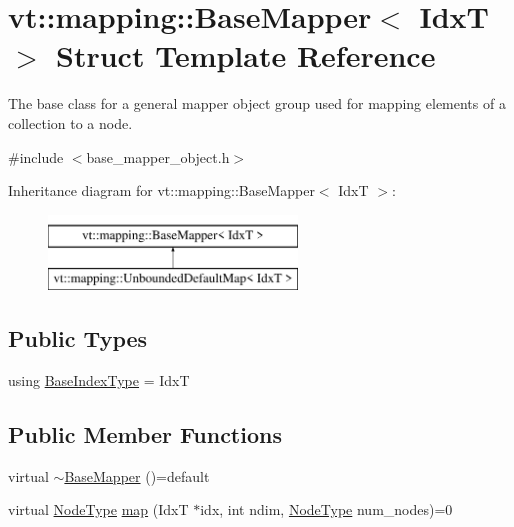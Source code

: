 \hypertarget{structvt_1_1mapping_1_1_base_mapper}{}\section{vt\+:\+:mapping\+:\+:Base\+Mapper$<$ IdxT $>$ Struct Template Reference}
\label{structvt_1_1mapping_1_1_base_mapper}


The base class for a general mapper object group used for mapping elements of a collection to a node.  




{\ttfamily \#include $<$base\+\_\+mapper\+\_\+object.\+h$>$}

Inheritance diagram for vt\+:\+:mapping\+:\+:Base\+Mapper$<$ IdxT $>$\+:\begin{figure}[H]
\begin{center}
\leavevmode
\includegraphics[height=2.000000cm]{structvt_1_1mapping_1_1_base_mapper}
\end{center}
\end{figure}
\subsection*{Public Types}
\begin{DoxyCompactItemize}
\item 
using \hyperlink{structvt_1_1mapping_1_1_base_mapper_a92c525b6dd69ead3a631626a75c4c0bc}{Base\+Index\+Type} = IdxT
\end{DoxyCompactItemize}
\subsection*{Public Member Functions}
\begin{DoxyCompactItemize}
\item 
virtual \hyperlink{structvt_1_1mapping_1_1_base_mapper_acafa2909b2b0fd8e3a907562c099f722}{$\sim$\+Base\+Mapper} ()=default
\item 
virtual \hyperlink{namespacevt_a866da9d0efc19c0a1ce79e9e492f47e2}{Node\+Type} \hyperlink{structvt_1_1mapping_1_1_base_mapper_a940a3ea301c0f60b2b88218afbce5a4f}{map} (IdxT $\ast$idx, int ndim, \hyperlink{namespacevt_a866da9d0efc19c0a1ce79e9e492f47e2}{Node\+Type} num\+\_\+nodes)=0
\end{DoxyCompactItemize}


